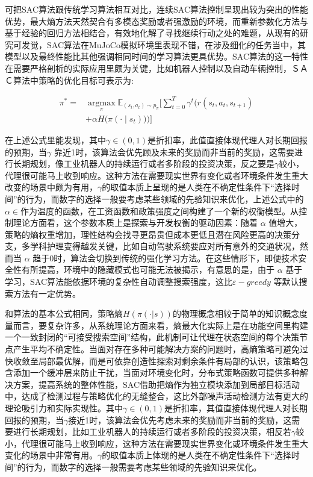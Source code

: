可把SAC算法跟传统学习算法相互对比，连续SAC算法控制呈现出较为突出的性能优势，最大熵方法天然契合有多模态奖励或者强激励的环境，而重新参数化方法与基于经验的回归方法相结合，有效地化解了寻找继续行动之处的难题，从现有的研究可发觉，SAC算法在MuJoCo模拟环境里表现不错，在涉及细化的任务当中，其模型以及最终性能比其他强调相同时间的学习算法更具优势。SAC算法的这一特性在需要严格剖析的实际应用里颇为关键，比如机器人控制以及自动车辆控制，ＳＡＣ算法中策略的优化目标可表示为:

\begin{align}
	\pi^* =& \operatorname*{argmax}_{\pi} \mathbb{E}_{(s_t, a_t) \sim p_{\pi}} \Bigg[ \sum_{t=0}^T \gamma^t \bigg( r(s_t, a_t, s_{t+1}) \\
	&+ \alpha H\big(\pi({\cdot} \mid s_t)\big) \bigg) \Bigg]
\end{align}

在上述公式里能发现，其中\(γ∈(0,1)\)是折扣率，此值直接体现代理人对长期回报的预期，当\(γ\) 靠近1时，该算法会优先顾及未来的奖励而非当前的奖励，这需要进行长期规划，像工业机器人的持续运行或者多阶段的投资决策，反之要是\(γ\)较小，代理很可能马上收到响应。这种方法在需要现实世界有变化或者环境条件发生重大改变的场景中颇为有用，\(γ\)的取值本质上呈现的是人类在不确定性条件下“选择时间”的行为，而数字的选择一般要考虑某些领域的先验知识来优化，上述公式中的\(α∈\)作为温度的函数，在工资函数和政策强度之间构建了一个新的权衡模型。从控制理论方面看，这个参数本质上是探索与开发权衡的驱动因素：随着 \(α\) 值增大，策略的熵权重增加，理性结构会找寻更昂贵但成本更低且潜在风险更高的决策分支，多学科护理变得越发关键，比如自动驾驶系统要应对所有意外的交通状况，然而当  \(α\) 趋于0时，算法会切换到传统的强化学习方法。在这些情形下，即便技术安全性有所提高，环境中的隐藏模式也可能无法被揭示，有意思的是，由于 \(α\) 基于学习，SAC算法能依据环境的复杂性自动调整搜索强度，这比\(ε-greedy\) 等默认搜索方法有一定优势。

和算法的基本公式相同，策略熵\(H(π(·|s))\)的物理概念相较于简单的知识概念度量而言，要复杂许多，从系统理论方面来看，熵最大化实际上是在功能空间里构建一个一致封闭的“可接受搜索空间”结构，此机制可让代理在状态空间的每个决策节点产生平均不确定性。当面对存在多种可能解决方案的问题时，高熵策略可避免过快收敛至局部最优解，而是可依靠创造性探索对剩余条件有局部的认识，该策略包含添加一个缓冲层来防止干扰，当面对环境变化时，分布式策略函数可提供多种解决方案，提高系统的整体性能，SAC借助把熵作为独立模块添加到局部目标活动中，达成了检测过程与策略优化的无缝整合，这比外部噪声活动检测方法有更大的理论吸引力和实际实现性。其中\(γ∈(0,1)\)是折扣率，其值直接体现代理人对长期回报的预期，当\(γ\)接近1时，该算法会优先考虑未来的奖励而非当前的奖励，这需要进行长期规划，比如工业机器人的持续运行或者多阶段的投资决策，相反若\(γ\)较小，代理很可能马上收到响应，这种方法在需要现实世界变化或环境条件发生重大变化的场景中非常有用。\(γ\)的取值本质上体现的是人类在不确定性条件下“选择时间”的行为，而数字的选择一般需要考虑某些领域的先验知识来优化。

